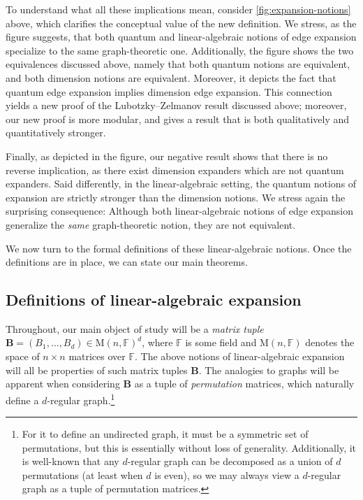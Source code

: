 \documentclass[11pt]{article}
\theoremstyle{plain}
\numberwithin{equation}{section}
\theoremstyle{definition}
\newcommand{\F}{\mathbb{F}}
\newcommand{\M}{\mathrm{M}}
\newcommand{\tuple}[1]{\mathbf{#1}}
\newcommand{\vB}{\tuple{B}}
\begin{document}
To understand what all these implications mean, consider \cref{fig:expansion-notions} above, which clarifies the conceptual value of the new definition. We stress, as the figure suggests, that both quantum and linear-algebraic notions of edge expansion specialize to the same graph-theoretic one. Additionally, the figure shows the two equivalences discussed above, namely that both 
%
quantum
%
notions are equivalent, and both 
%
dimension
%
notions are equivalent. Moreover, it depicts the fact that quantum edge expansion implies dimension edge expansion. This connection yields a new proof of the Lubotzky--Zelmanov result discussed above; moreover, our new proof is more modular, and gives a result that is both qualitatively and quantitatively stronger.

Finally, as depicted in the figure, our negative result shows that there is no reverse implication, as there exist dimension expanders which are not quantum expanders. Said differently, in the linear-algebraic setting, the 
%
quantum
%
notions of expansion are strictly stronger than the 
%
dimension
%
notions. We stress again the surprising consequence: Although both linear-algebraic notions of edge expansion generalize the \emph{same} graph-theoretic notion, they are not equivalent.

We now turn to the formal definitions of these linear-algebraic notions. Once the definitions are in place, we can state our main theorems.

\subsection{Definitions of linear-algebraic expansion}
Throughout, our main object of study will be a \emph{matrix tuple} $\vB=(B_1,\dots,B_d) \in \M(n,\F)^d$, where $\F$ is some field and $\M(n,\F)$ denotes the space of $n\times n$ matrices over $\F$. The above notions of linear-algebraic expansion will all be properties of such matrix tuples $\vB$. The analogies to graphs will be apparent when considering $\vB$ as a tuple of \emph{permutation} matrices, which naturally define a $d$-regular graph.\footnote{For it to define an undirected graph, it must be a symmetric set of permutations, but this is essentially without loss of generality. Additionally, it is well-known \cite{Gross77} that any $d$-regular graph can be decomposed as a union of $d$ permutations (at least when $d$ is even), so we may always view a $d$-regular graph as a tuple of permutation matrices.}
\end{document}
